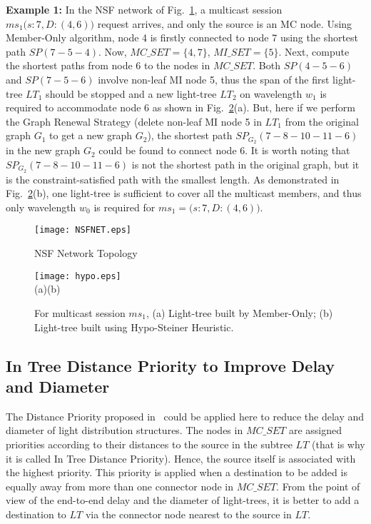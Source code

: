 \documentclass[conference]{IEEEtran}
\begin{document}
\textbf{Example 1:}
In the NSF network of Fig.~\ref{fig: NSFnet}, a multicast session $ms_{1}\big(s:7,D:(4, 6)\big)$ request arrives, and only the source is an MC node. Using Member-Only algorithm, node 4 is firstly connected to node 7 using the shortest path $SP(7-5-4)$. Now, $MC\_SET = \{4, 7\}$, $MI\_SET = \{5\}$. Next, compute the shortest paths from node 6 to the nodes in $MC\_SET$.  Both $SP(4-5-6)$ and $SP(7-5-6)$ involve non-leaf MI node 5, thus the span of the first light-tree $LT_{1}$ should be stopped and a new light-tree $LT_{2}$ on wavelength $w_{1}$ is required to accommodate node 6 as shown in Fig.~\ref{fig: hypo}(a). But, here if we perform the Graph Renewal Strategy (delete non-leaf MI node 5 in $LT_{1}$ from the original graph $G_{1}$ to get a new graph $G_{2}$), the shortest path $SP_{G_{2}}(7-8-10-11-6)$ in the new graph $G_{2}$ could be found to connect node 6. It is worth noting that $SP_{G_{2}}(7-8-10-11-6)$ is not the shortest path in the original graph, but it is the constraint-satisfied path with the smallest length. As demonstrated in Fig.~\ref{fig: hypo}(b), one light-tree is sufficient to cover all the multicast members, and thus only wavelength $w_{0}$ is required for $ms_{1}=\big(s:7,D:(4, 6)\big)$.

    \begin{figure}
\begin{center}
        \texttt{[image: NSFNET.eps]}
        \end{center}
\caption{NSF Network Topology}
        \label{fig: NSFnet}       \end{figure}

    \begin{figure}
        \centering
        \texttt{[image: hypo.eps]}\\
        \mbox{(a)}\hspace{.8in}\mbox{(b)}
        \caption{For multicast session $ms_{1}$, (a) Light-tree built by Member-Only; (b) Light-tree built using Hypo-Steiner Heuristic.}
        \label{fig: hypo}
    \end{figure}


\subsection{In Tree Distance Priority to Improve Delay and Diameter}
\label{subsec: Distance Priority to Improve Delay and Diameter}
The Distance Priority proposed in~\cite{fZhou2008ICCS} could be applied here to reduce the delay and diameter of light distribution structures. The nodes in $MC\_SET$ are assigned priorities according to their distances to the source in the subtree $LT$ (that is why it is called In Tree Distance Priority). Hence, the source itself is associated with the highest priority. This priority is applied when a destination to be added is equally away from more than one connector node in $MC\_SET$. From the point of view of the end-to-end delay and the diameter of light-trees, it is better to add a destination to $LT$ via the connector node nearest to the source in $LT$.
\end{document}
